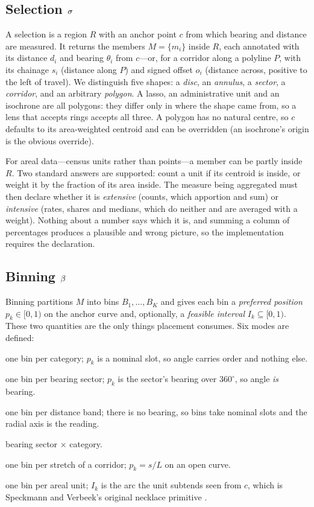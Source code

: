 \subsection{Selection $\sigma$}

A selection is a region $R$ with an anchor point $c$ from which bearing and
distance are measured. It returns the members $M=\{m_i\}$ inside $R$, each
annotated with its distance $d_i$ and bearing $\theta_i$ from $c$---or, for a
corridor along a polyline $P$, with its chainage $s_i$ (distance along $P$) and
signed offset $o_i$ (distance across, positive to the left of travel). We
distinguish five shapes: a \emph{disc}, an \emph{annulus}, a \emph{sector}, a
\emph{corridor}, and an arbitrary \emph{polygon}. A lasso, an administrative
unit and an isochrone are all polygons: they differ only in where the shape
came from, so a lens that accepts rings accepts all three. A polygon has no
natural centre, so $c$ defaults to its area-weighted centroid and can be
overridden (an isochrone's origin is the obvious override).

For areal data---census units rather than points---a member can be partly
inside $R$. Two standard answers are supported: count a unit if its centroid is
inside, or weight it by the fraction of its area inside. The measure being
aggregated must then declare whether it is \emph{extensive} (counts, which
apportion and sum) or \emph{intensive} (rates, shares and medians, which do
neither and are averaged with a weight). Nothing about a number says which it
is, and summing a column of percentages produces a plausible and wrong
picture, so the implementation requires the declaration.

\subsection{Binning $\beta$}

Binning partitions $M$ into bins $B_1,\dots,B_K$ and gives each bin a
\emph{preferred position} $p_k\in[0,1)$ on the anchor curve and, optionally, a
\emph{feasible interval} $I_k\subseteq[0,1)$. These two quantities are the only
things placement consumes. Six modes are defined:

\begin{description}[leftmargin=0pt, itemsep=1pt]
  \item[categorical] one bin per category; $p_k$ is a nominal slot, so angle
    carries order and nothing else.
  \item[angular] one bin per bearing sector; $p_k$ is the sector's bearing
    over $360^\circ$, so angle \emph{is} bearing.
  \item[radial] one bin per distance band; there is no bearing, so bins take
    nominal slots and the radial axis is the reading.
  \item[cross] bearing sector $\times$ category.
  \item[chainage] one bin per stretch of a corridor; $p_k = s/L$ on an open
    curve.
  \item[unit] one bin per areal unit; $I_k$ is the arc the unit subtends seen
    from $c$, which is Speckmann and Verbeek's original necklace primitive
    \cite{speckmann2010necklace}.
\end{description}

